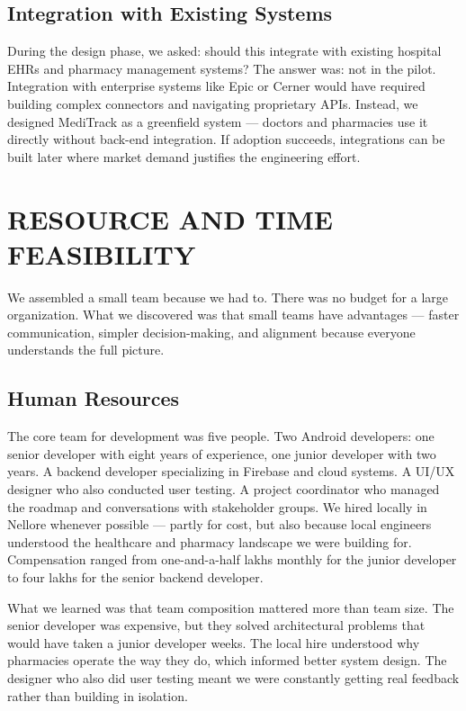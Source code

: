 \documentclass[12pt,a4paper]{report}
\begin{document}
\begin{itemize}
\subsection{Integration with Existing Systems}

During the design phase, we asked: should this integrate with existing hospital EHRs and pharmacy management systems? The answer was: not in the pilot. Integration with enterprise systems like Epic or Cerner would have required building complex connectors and navigating proprietary APIs. Instead, we designed MediTrack as a greenfield system — doctors and pharmacies use it directly without back-end integration. If adoption succeeds, integrations can be built later where market demand justifies the engineering effort.

\section{RESOURCE AND TIME FEASIBILITY}

We assembled a small team because we had to. There was no budget for a large organization. What we discovered was that small teams have advantages — faster communication, simpler decision-making, and alignment because everyone understands the full picture.

\subsection{Human Resources}

The core team for development was five people. Two Android developers: one senior developer with eight years of experience, one junior developer with two years. A backend developer specializing in Firebase and cloud systems. A UI/UX designer who also conducted user testing. A project coordinator who managed the roadmap and conversations with stakeholder groups. We hired locally in Nellore whenever possible — partly for cost, but also because local engineers understood the healthcare and pharmacy landscape we were building for. Compensation ranged from one-and-a-half lakhs monthly for the junior developer to four lakhs for the senior backend developer.

What we learned was that team composition mattered more than team size. The senior developer was expensive, but they solved architectural problems that would have taken a junior developer weeks. The local hire understood why pharmacies operate the way they do, which informed better system design. The designer who also did user testing meant we were constantly getting real feedback rather than building in isolation.


\end{itemize}
\end{document}
